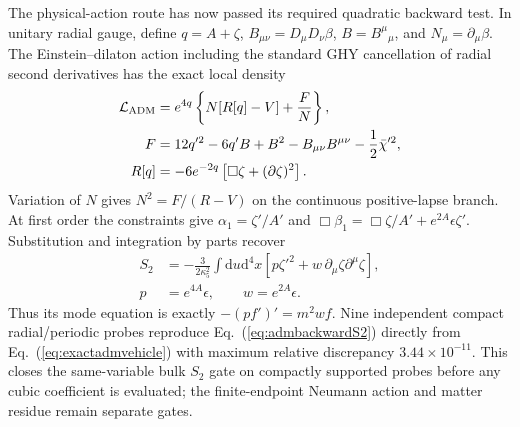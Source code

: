 \documentclass[10pt]{article}
\newcommand{\dd}{\mathrm{d}}
\begin{document}
The physical-action route has now passed its required quadratic backward
test.  In unitary radial gauge, define $q=A+\zeta$,
$B_{\mu\nu}=D_\mu D_\nu\beta$, $B=B^\mu{}_{\mu}$, and
$N_\mu=\partial_\mu\beta$.  The Einstein--dilaton action including the
standard GHY cancellation of radial second derivatives has the exact local
density
\begin{equation}
 \begin{aligned}
 {\cal L}_{\rm ADM}&=e^{4q}\left\{N[R[q]-V]+\frac{F}{N}\right\},\\
 F&=12q'^2-6q'B+B^2-B_{\mu\nu}B^{\mu\nu}
 -\frac12\bar\chi'^2,\\
 R[q]&=-6e^{-2q}\left[\Box\zeta+(\partial\zeta)^2\right].
 \end{aligned}
 \label{eq:exactadmvehicle}
\end{equation}
Variation of $N$ gives $N^2=F/(R-V)$ on the continuous positive-lapse
branch.  At first order the constraints give
$\alpha_1=\zeta'/A'$ and
$\Box\beta_1=\Box\zeta/A'+e^{2A}\epsilon\zeta'$.  Substitution and integration
by parts recover
\begin{equation}
 \begin{aligned}
 S_2&=-\frac{3}{2\kappa_5^2}\int\dd u\dd^4x
 \left[p\zeta'^2+w\,\partial_\mu\zeta\partial^\mu\zeta\right],\\
 p&=e^{4A}\epsilon,\qquad w=e^{2A}\epsilon .
 \end{aligned}
 \label{eq:admbackwardS2}
\end{equation}
Thus its mode equation is exactly $-(pf')'=m^2wf$.  Nine independent compact
radial/periodic probes reproduce Eq.~(\ref{eq:admbackwardS2}) directly from
Eq.~(\ref{eq:exactadmvehicle}) with maximum relative discrepancy
$3.44\times10^{-11}$.  This closes the same-variable bulk $S_2$ gate on
compactly supported probes before any cubic coefficient is evaluated; the
finite-endpoint Neumann action and matter residue remain separate gates.
\end{document}
